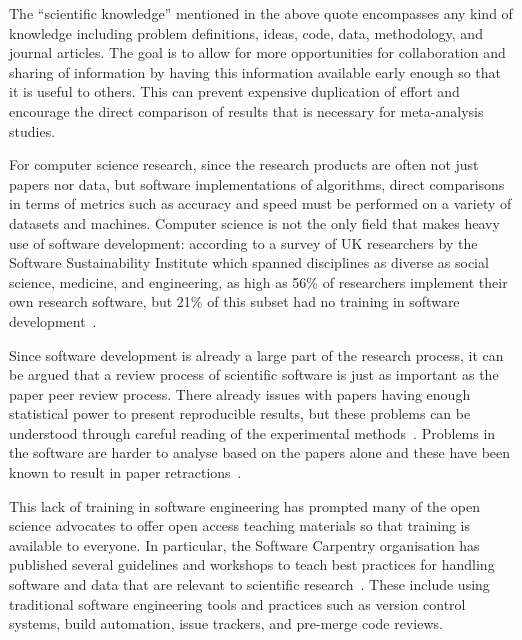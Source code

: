 The ``scientific knowledge'' mentioned in the above quote
encompasses any kind of knowledge including problem definitions,
ideas, code, data, methodology, and journal articles. The goal is
to allow for more opportunities for collaboration and sharing of
information by having this information available early enough so
that it is useful to others. This can prevent expensive
duplication of effort and encourage the direct comparison of
results that is necessary for meta-analysis studies.

For computer science research, since the research
products are often not just papers nor data, but software
implementations of algorithms, direct comparisons in terms of
metrics such as accuracy and speed must be performed on a variety of
datasets and machines. Computer science is not the only field that
makes heavy use of software development:
according to a survey of UK researchers by the Software
Sustainability Institute which spanned disciplines as diverse as
social science, medicine, and engineering, as high as 56\% of
researchers implement their own research software, but 21\% of
this subset had no training in software
development~\autocite{SSI:hettrick_2014_14809}.

Since software development is already a large part of the research
process, it can be argued that a review process of scientific
software is just as important as the paper peer review process.
There already issues with papers having enough statistical power
to present reproducible results, but these problems can be
understood through careful reading of the experimental
methods~\autocite{Ioannidis2005,Button2013}. Problems in the software
are harder to analyse based on the papers alone and these have
been known to result in paper retractions~\autocite{Miller2006,Merali2010,Joppa2013}.

This lack of training in software engineering has prompted many of
the open science advocates to offer open access teaching
materials so that training is available to everyone.
In particular, the Software Carpentry organisation has
published several guidelines and workshops to teach best
practices for handling software and data that are relevant to
scientific research~\autocite{Wilson2006,Wilson2014}. These
include using traditional software engineering tools and practices
such as version control systems, build automation, issue
trackers, and pre-merge code reviews.

